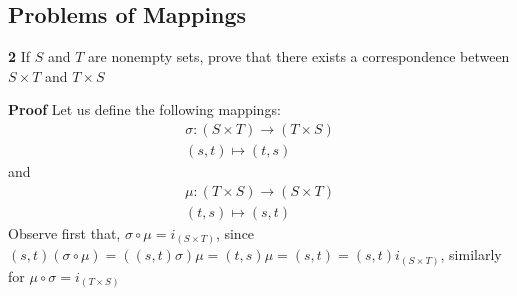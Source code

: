 \documentclass[11pt,a4paper]{article}
\begin{document}
\subsection{Problems of Mappings}
\textbf{2} If $S$ and $T$ are nonempty sets, prove that there exists a correspondence between $ S \times T$ and $ T \times S$


\textbf{Proof}
Let us define the following mappings:
\begin{align*}
\sigma: (S \times T) \rightarrow (T \times S) \\
(s,t) \longmapsto (t,s)
\end{align*}
and 
\begin{align*}
\mu: (T \times S) \rightarrow (S \times T) \\
(t,s) \longmapsto (s,t)
\end{align*}
Observe first that, $ \sigma \circ \mu  = i_{(S \times T)} $, since $ (s,t)(\sigma \circ \mu) = ((s,t)\sigma)\mu = (t,s)\mu = (s,t) = (s,t)i_{(S \times T)} $, similarly for $ \mu \circ \sigma = i_{(T \times S)} $
\end{document}
